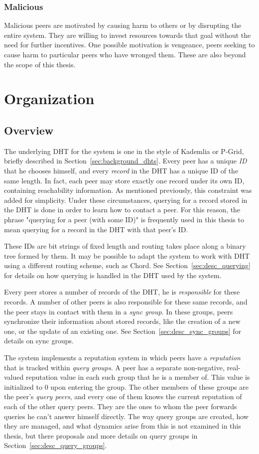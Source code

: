 \subsubsection{Malicious}
Malicious peers are motivated by causing harm to others or by disrupting the
entire system. They are willing to invest resources towards that goal without
the need for further incentives. One possible motivation is vengeance, peers
seeking to cause harm to particular peers who have wronged them. These are also
beyond the scope of this thesis.

\section{Organization}
\subsection{Overview}
The underlying DHT for the system is one in the style of Kademlia or P-Grid,
briefly described in Section~\ref{sec:background_dhts}. Every peer has a unique
\emph{ID} that he chooses himself, and every \emph{record} in the DHT has a
unique ID of the same length. In fact, each peer may store exactly one record
under its own ID, containing reachability information. As mentioned previously,
this constraint was added for simplicity. Under these circumstances, querying
for a record stored in the DHT is done in order to learn how to contact a peer.
For this reason, the phrase "querying for a peer (with some ID)" is frequently
used in this thesis to mean querying for a record in the DHT with that peer's
ID.

These IDs are bit strings of fixed length and routing takes place along a binary
tree formed by them. It may be possible to adapt the system to work with DHT
using a different routing scheme, such as Chord. See
Section~\ref{sec:desc_querying} for details on how querying is handled in the
DHT used by the system.

Every peer stores a number of records of the DHT, he is \emph{responsible} for
these records. A number of other peers is also responsible for these same
records, and the peer stays in contact with them in a \emph{sync group}. In
these groups, peers synchronize their information about stored records, like the
creation of a new one, or the update of an existing one. See
Section~\ref{sec:desc_sync_groups} for details on sync groups.

The system implements a reputation system in which peers have a
\emph{reputation} that is tracked within \emph{query groups}. A peer has a
separate non-negative, real-valued reputation value in each such group that he
is a member of. This value is initialized to 0 upon entering the group. The
other members of these groups are the peer's \emph{query peers}, and every one
of them knows the current reputation of each of the other query peers. They are
the ones to whom the peer forwards queries he can't answer himself directly. The
way query groups are created, how they are managed, and what dynamics arise from
this is not examined in this thesis, but there proposals and more details on
query groups in Section~\ref{sec:desc_query_groups}.

